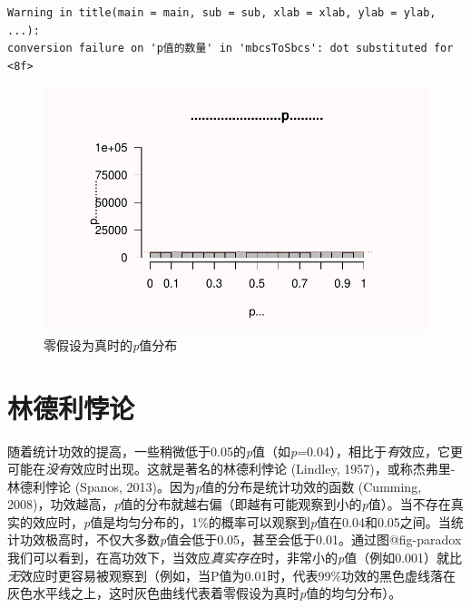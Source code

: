 \documentclass[
  letterpaper,
  DIV=11,
  numbers=noendperiod]{scrreprt}
\begin{document}
\begin{verbatim}
Warning in title(main = main, sub = sub, xlab = xlab, ylab = ylab, ...):
conversion failure on 'p值的数量' in 'mbcsToSbcs': dot substituted for <8f>
\end{verbatim}

\begin{figure}

{\centering \includegraphics[width=1\textwidth,height=\textheight]{01-pvalue_files/figure-pdf/fig-pdistr2-1.pdf}

}

\caption{\label{fig-pdistr2}零假设为真时的\emph{p}值分布}

\end{figure}

\hypertarget{sec-lindley}{%
\section{林德利悖论}\label{sec-lindley}}

随着统计功效的提高，一些稍微低于0.05的\emph{p}值（如\emph{p}=0.04），相比于\emph{有}效应，它更可能在\emph{没有}效应时出现。这就是著名的林德利悖论
(Lindley, 1957)，或称杰弗里-林德利悖论 (Spanos,
2013)。因为\emph{p}值的分布是统计功效的函数 (Cumming,
2008)，功效越高，\emph{p}值的分布就越右偏（即越有可能观察到小的\emph{p}值）。当不存在真实的效应时，\emph{p}值是均匀分布的，1\%的概率可以观察到\emph{p}值在0.04和0.05之间。当统计功效极高时，不仅大多数\emph{p}值会低于0.05，甚至会低于0.01。通过图@fig-paradox我们可以看到，在高功效下，当效应\emph{真实存在}时，非常小的\emph{p}值（例如0.001）就比\emph{无}效应时更容易被观察到（例如，当P值为0.01时，代表99\%功效的黑色虚线落在灰色水平线之上，这时灰色曲线代表着零假设为真时\emph{p}值的均匀分布）。
\end{document}
